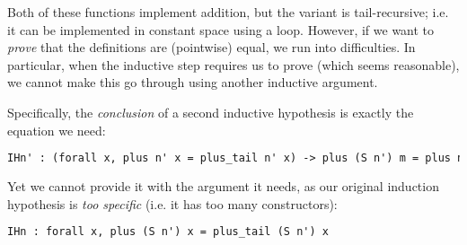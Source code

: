 \documentclass[]{article}
\begin{document}
\iffalse
Haskell equivalent:

plus :: Nat -> Nat -> Nat
plus      n  Z    = n
plus      n (S m) = S (plus n m)

plus_tail :: Nat -> Nat -> Nat
plus_tail n  Z    = n
plus_tail n (S m) = plus_tail (S n) m
\fi

Both of these functions implement addition, but the  variant is tail-recursive; i.e. it can be implemented in constant space using a loop. However, if we want to \emph{prove} that the definitions are (pointwise) equal, we run into difficulties. In particular, when the inductive step requires us to prove  (which seems reasonable), we cannot make this go through using another inductive argument.

\iffalse

\begin{lstlisting}[language=ML, xleftmargin=.2\textwidth, xrightmargin=.2\textwidth]
(* Solve equalities by beta-normalising both sides *)
Ltac triv := try (simpl; reflexivity).

(* Prove equivalence of plus and plus_tail *)
Theorem equiv : forall n m, plus n m = plus_tail n m.
  induction n; triv. (* Base case is trivial *)

  (* Inductive case: plus (S n) m = plus_tail (S n) m *)
  intro m.

  (* Beta-reduce the right-hand-side (justification is trivial) *)
  replace (plus_tail (S n) m) with (plus_tail n (S m)); triv.

  (* Use induction hypothesis to replace plus_tail with plus *)
  rewrite <- (IHn (S m)).
\end{lstlisting}

\fi

Specifically, the \emph{conclusion} of a second inductive hypothesis is exactly the equation we need:

\begin{lstlisting}[language=ML, xleftmargin=.2\textwidth, xrightmargin=.2\textwidth]
IHn' : (forall x, plus n' x = plus_tail n' x) -> plus (S n') m = plus n' (S m)
\end{lstlisting}

Yet we cannot provide it with the argument it needs, as our original induction hypothesis is \emph{too specific} (i.e. it has too many  constructors):

\begin{lstlisting}[language=ML, xleftmargin=.2\textwidth, xrightmargin=.2\textwidth]
IHn : forall x, plus (S n') x = plus_tail (S n') x
\end{lstlisting}
\end{document}

